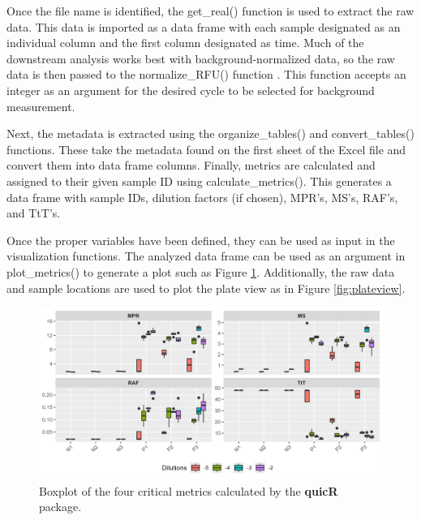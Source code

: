 \documentclass[preprint,12pt,a4paper]{elsarticle}
\begin{document}
            Once the file name is identified, the get\_real() function is used to extract the raw data. This data is imported as a data frame with each sample designated as an individual column and the first column designated as time. Much of the downstream analysis works best with background-normalized data, so the raw data is then passed to the normalize\_RFU() function \cite{Rowden2023}. This function accepts an integer as an argument for the desired cycle to be selected for background measurement. 
            
            Next, the metadata is extracted using the organize\_tables() and convert\_tables() functions. These take the metadata found on the first sheet of the Excel file and convert them into data frame columns. Finally, metrics are calculated and assigned to their given sample ID using calculate\_metrics(). This generates a data frame with sample IDs, dilution factors (if chosen), MPR's, MS's, RAF's, and TtT's.

            Once the proper variables have been defined, they can be used as input in the visualization functions. The analyzed data frame can be used as an argument in plot\_metrics() to generate a plot such as Figure \ref{fig:boxplot}. Additionally, the raw data and sample locations are used to plot the plate view as in Figure \ref{fig:plateview}.

            \begin{figure}[ht]
                \centering
                \includegraphics[width=\textwidth]{images/boxplot.png}
                \caption{Boxplot of the four critical metrics calculated by the \textbf{quicR} package.}
                \label{fig:boxplot}
            \end{figure}
\end{document}
